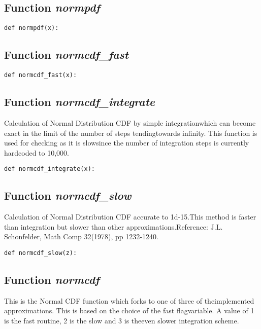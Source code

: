 \documentclass[twoside,11pt]{book}
\begin{document}
\subsection{Function {\it normpdf}}


\begin{lstlisting}
def normpdf(x):
\end{lstlisting}

\subsection{Function {\it normcdf\_fast}}


\begin{lstlisting}
def normcdf_fast(x):
\end{lstlisting}

\subsection{Function {\it normcdf\_integrate}}
Calculation of Normal Distribution CDF by simple integrationwhich can become exact in the limit of the number of steps tendingtowards infinity. This function is used for checking as it is slowsince the number of integration steps is currently hardcoded to 10,000.

\begin{lstlisting}
def normcdf_integrate(x):
\end{lstlisting}

\subsection{Function {\it normcdf\_slow}}
Calculation of Normal Distribution CDF accurate to 1d-15.This method is faster than integration but slower than other approximations.Reference: J.L. Schonfelder, Math Comp 32(1978), pp 1232-1240. 

\begin{lstlisting}
def normcdf_slow(z):
\end{lstlisting}

\subsection{Function {\it normcdf}}
This is the Normal CDF function which forks to one of three of theimplemented approximations. This is based on the choice of the fast flagvariable. A value of 1 is the fast routine, 2 is the slow and 3 is theeven slower integration scheme. 
\end{document}
